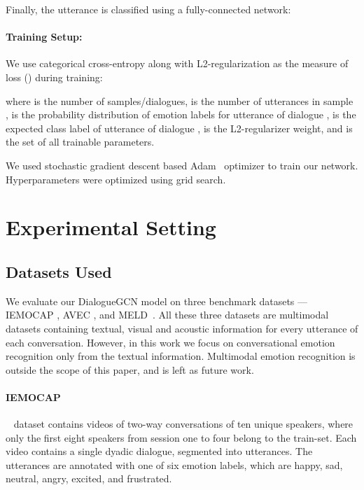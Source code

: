 \documentclass[11pt,a4paper]{article}
\begin{document}
 Finally, the utterance is classified using a fully-connected network:
 

\paragraph{Training Setup:}

We use categorical cross-entropy along with L2-regularization as the measure of loss () during training:

where  is the number of samples/dialogues,  is the number of utterances in sample ,  is the probability distribution of emotion labels for utterance  of dialogue ,  is the expected class label of utterance  of dialogue ,  is the L2-regularizer weight, and  is the set of all trainable parameters. 


We used stochastic gradient descent based Adam~\cite{DBLP:journals/corr/KingmaB14} optimizer to
train our network. Hyperparameters were optimized using grid search. 





\section{Experimental Setting}
\label{sec:experiments}

\subsection{Datasets Used}
\label{sec:dataset-details}
We evaluate our DialogueGCN model on three benchmark datasets --- IEMOCAP \cite{iemocap}, AVEC \cite{Schuller:2012:ACA:2388676.2388776}, and MELD~\cite{poria2018meld}. All these three datasets are multimodal datasets containing textual, visual and acoustic information for every utterance of each conversation.
However, in this work we focus on conversational emotion recognition only from the textual information. Multimodal emotion recognition is outside the scope of this paper, and is left as future work.


\paragraph{IEMOCAP}~\cite{iemocap} dataset contains videos of two-way conversations of ten unique speakers, where only the first eight speakers from session one to four belong to the train-set. 
Each video contains a single dyadic dialogue, segmented into utterances. 
The utterances are annotated with one of six emotion labels, which are happy, sad, neutral, angry, excited, and frustrated.
\end{document}
